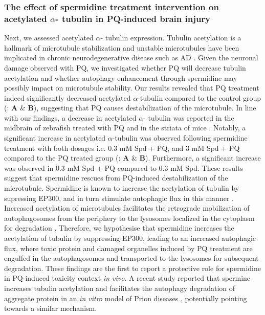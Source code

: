 \subsubsection{The effect of spermidine treatment intervention on acetylated $\alpha$- tubulin in PQ-induced brain injury}
Next, we assessed acetylated $\alpha$- tubulin expression. Tubulin acetylation is a hallmark of microtubule stabilization and unstable microtubules have been implicated in chronic neurodegenerative disease such as AD \citep{Phadwal2018}. Given the neuronal damage observed with PQ, we investigated whether PQ will decrease tubulin acetylation and whether autophagy enhancement through spermidine may possibly impact on microtubule stability. Our results revealed that PQ treatment indeed significantly decreased acetylated $\alpha$-tubulin compared to the control group (: \textbf{A} \& \textbf{B}), suggesting that PQ causes destabilization of the microtubule. In line with our findings, a decrease in acetylated $\alpha$- tubulin was reported in the midbrain of zebrafish treated with PQ \citep{Pinho2019} and in the striata of mice \citep{Wills2012}. Notably, a significant increase in acetylated $\alpha$-tubulin was observed following spermidine treatment with both dosages i.e. 0.3 mM Spd + PQ, and 3 mM Spd + PQ compared to the PQ treated group (: \textbf{A} \& \textbf{B}). Furthermore, a significant increase was observed in 0.3 mM Spd + PQ compared to 0.3 mM Spd. These results suggest that spermidine rescues from PQ-induced destabilization of the microtubule. Spermidine is known to increase the acetylation of tubulin by supressing EP300, and in turn stimulate autophagic flux in this manner \citep{Madeo2018}. Increased acetylation of microtubules facilitates the retrograde mobilization of autophagosomes from the periphery to the lysosomes localized in the cytoplasm for degradation \citep{Phadwal2018,Xie2010}. Therefore, we hypothesise that spermidine increases the acetylation of tubulin by suppressing EP300, leading to an increased autophagic flux, where toxic protein and damaged organelles induced by PQ treatment are engulfed in the autophagosomes and transported to the lysosomes for subsequent degradation. These findings are the first to report a protective role for spermidine in PQ-induced toxicity context \textit{in vivo}. A recent study reported that spermine increases tubulin acetylation and facilitates the autophagy degradation of aggregate protein in an \textit{in vitro} model of Prion diseases \citep{Phadwal2018}, potentially pointing towards a similar mechanism.

